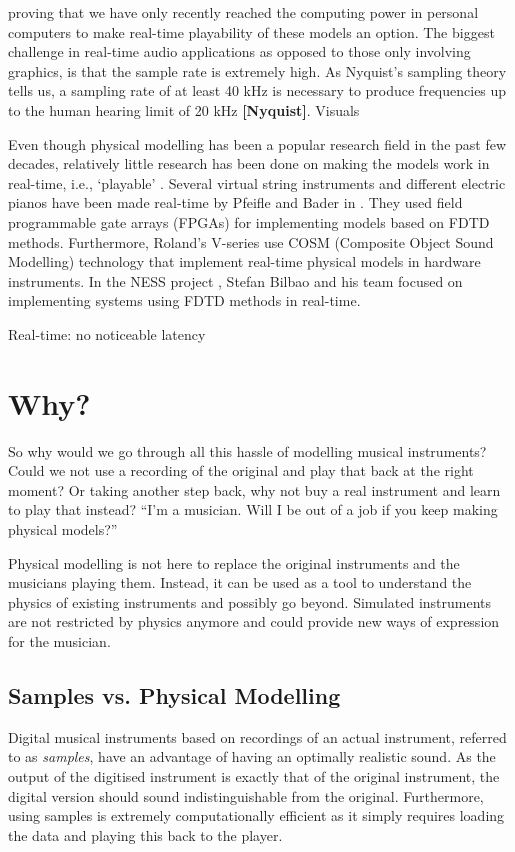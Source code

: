proving that we have only recently reached the computing power in personal computers to make real-time playability of these models an option. The biggest challenge in real-time audio applications as opposed to those only involving graphics, is that the sample rate is extremely high. As Nyquist's sampling theory tells us, a sampling rate of at least 40 kHz is necessary to produce frequencies up to the human hearing limit of 20 kHz \textbf{[Nyquist]}. Visuals 

Even though physical modelling has been a popular research field in the past few decades, relatively little research has been done on making the models work in real-time, i.e., `playable’ \cite{Mehes2016}. Several virtual string instruments and different electric pianos have been made real-time by Pfeifle and Bader in \cite{Pfeifle2012, Pfeifle2015, Pfeifle2017}. They used field programmable gate arrays (FPGAs) for implementing models based on FDTD methods. Furthermore, Roland’s V-series use COSM (Composite Object Sound Modelling) technology \cite{Bybee2019} that implement real-time physical models in hardware instruments. In the NESS project \cite{Bilbao2019CMJa,Bilbao2019CMJb}, Stefan Bilbao and his team focused on implementing systems using FDTD methods in real-time.

Real-time: no noticeable latency

\section{Why?}
So why would we go through all this hassle of modelling musical instruments? Could we not use a recording of the original and play that back at the right moment? Or taking another step back, why not buy a real instrument and learn to play that instead? ``I'm a musician. Will I be out of a job if you keep making physical models?''


Physical modelling is not here to replace the original instruments and the musicians playing them. Instead, it can be used as a tool to understand the physics of existing instruments and possibly go beyond. Simulated instruments are not restricted by physics anymore and could provide new ways of expression for the musician. 

\subsection{Samples vs. Physical Modelling}
Digital musical instruments based on recordings of an actual instrument, referred to as \textit{samples}, have an advantage of having an optimally realistic sound. As the output of the digitised instrument is exactly that of the original instrument, the digital version should sound indistinguishable from the original. Furthermore, using samples is extremely computationally efficient as it simply requires loading the data and playing this back to the player.

